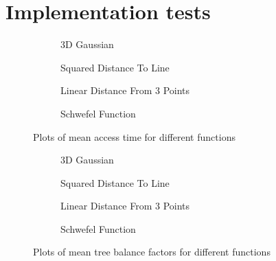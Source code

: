 \section{Implementation tests}

\begin{figure}
    \centering
    \begin{subfigure}[b]{0.5\textwidth}
        \resizebox{1.0\textwidth}{!}{}
        \caption{3D Gaussian}
        \label{fig:access_time_0}
    \end{subfigure}\hfill
    \begin{subfigure}[b]{0.5\textwidth}
        \resizebox{1.0\textwidth}{!}{}
        \caption{Squared Distance To Line}
        \label{fig:access_time_1}
    \end{subfigure}
    \begin{subfigure}[b]{0.5\textwidth}
        \resizebox{1.0\textwidth}{!}{}
        \caption{Linear Distance From 3 Points}
        \label{fig:access_time_2}
    \end{subfigure}\hfill
    \begin{subfigure}[b]{0.5\textwidth}
        \resizebox{1.0\textwidth}{!}{}
        \caption{Schwefel Function}
        \label{fig:access_time_3}
    \end{subfigure}
    \caption{Plots of mean access time for different functions}
    \label{fig:access_time}
\end{figure}

\begin{figure}
    \centering
    \begin{subfigure}[b]{0.5\textwidth}
        \resizebox{1.0\textwidth}{!}{}
        \caption{3D Gaussian}
        \label{fig:balance_mean_0}
    \end{subfigure}\hfill
    \begin{subfigure}[b]{0.5\textwidth}
        \resizebox{1.0\textwidth}{!}{}
        \caption{Squared Distance To Line}
        \label{fig:balance_mean_1}
    \end{subfigure}
    \begin{subfigure}[b]{0.5\textwidth}
        \resizebox{1.0\textwidth}{!}{}
        \caption{Linear Distance From 3 Points}
        \label{fig:balance_mean_2}
    \end{subfigure}\hfill
    \begin{subfigure}[b]{0.5\textwidth}
        \resizebox{1.0\textwidth}{!}{}
        \caption{Schwefel Function}
        \label{fig:balance_mean_3}
    \end{subfigure}
    \caption{Plots of mean tree balance factors for different functions}
    \label{fig:balance_mean}
\end{figure}

